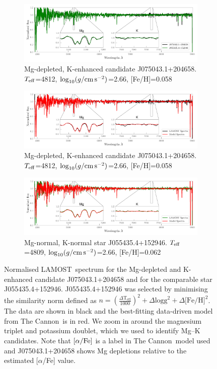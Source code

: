 \documentclass[a4paper,fleqn,usenatbib]{mnras}
\newcommand{\project}[1]{#1}
\newcommand{\lamost}{\project{LAMOST}}
\newcommand{\tc}{\project{The Cannon}}
\newcommand{\teff}{T_{\rm eff}}
\newcommand{\logg}{\log_{10}(g/{\rm cm\,s}^{-2})}
\begin{document}
\begin{figure}
\centering

\begin{subfigure}{1\textwidth}
\centering
\includegraphics[width=\textwidth=1]{similarstarsplot.png}
\caption{Mg-depleted, K-enhanced candidate J075043.1+204658. $\teff$=4812, $\logg$=2.66, [Fe/H]=0.058}
\end{subfigure}

\begin{subfigure}{1\textwidth}
\centering
\includegraphics[width=\textwidth=1]{posterchild.png}
\caption{Mg-depleted, K-enhanced candidate J075043.1+204658. $\teff$=4812, $\logg$=2.66, [Fe/H]=0.058}
\end{subfigure}

\begin{subfigure}{1\textwidth}
\centering
\includegraphics[width=\textwidth=1]{postermimic.png}
\caption{Mg-normal, K-normal star J055435.4+152946. $\teff$=4809, $\logg$=2.66, [Fe/H]=0.062}
\end{subfigure}

\caption{Normalised \lamost\ spectrum for the Mg-depleted and K-enhanced candidate J075043.1+204658 and for the comparable star J055435.4+152946. J055435.4+152946 was selected by minimising the similarity norm defined as $n=(\frac{\Delta \text{T}_{\text{eff}}}{1000})^2 +\Delta \text{logg} ^2 + \Delta \text{[Fe/H]}^2$. The data are shown in black and the best-fitting data-driven model from \tc\ is in red. We zoom in around the magnesium triplet and potassium doublet, which we used to identify Mg--K candidates. Note that $[\alpha/{\rm Fe}]$ is a label in \tc\ model used and J075043.1+204658 shows Mg depletions relative to the estimated [$\alpha$/Fe] value.}
\label{posterchild}
\end{figure}
\end{document}
